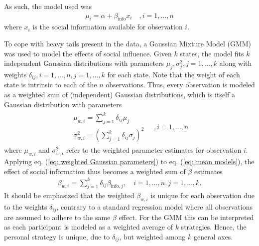 \documentclass[9pt,twocolumn,twoside,lineno]{pnas-new}
\begin{document}
{%
As such, the model used was
\begin{align}
	\mu_i = \alpha+\beta_\text{info} x_i \quad, i=1,\dots,n  \label{eq: mean models}
\end{align}
where $x_i$ is the social information available %
for observation $i$.

To cope with heavy tails present in the data, a Gaussian Mixture Model (GMM) was used to model the effects of social influence. Given $k$ states, the model fits $k$ independent Gaussian distributions with parameters $\mu_j, \sigma^2_j, j=1,\dots,k$ along with weights $\delta_{ij}, i=1,\dots, n, j=1,\dots ,k$ for each state. Note that the weight of each state is intrinsic to each of the $n$ observations. Thus, every observation is modeled as a weighted sum of (independent) Gaussian distributions, which is itself a Gaussian distribution with parameters
\begin{align}
\begin{array}{l}
	\mu_{w,i} = \sum_{j=1}^k \delta_{ij} \mu_j \\
	\sigma^2_{w,i} = \left(\sum_{j=1}^k \delta_{ij} \sigma_j\right)^2
\end{array}
\quad, i=1,\dots,n \label{eq: weighted Gaussian parameters}
\end{align}
where $\mu_{w,i}$ and $\sigma^2_{w,i}$ refer to the weighted parameter estimates for observation $i$. Applying eq. (\ref{eq: weighted Gaussian parameters}) to eq. (\ref{eq: mean models}), the effect of social information thus becomes a weighted sum of $\beta$ estimates
\begin{align}
	\beta_{w,i} = \sum_{j=1}^k \delta_{ij} \beta_{\text{info},j}, \quad i=1,\dots, n, j=1,\dots, k. \label{eq: weighted beta}
\end{align}
It should be emphasized that the weighted $\beta_{w,i}$ is unique for each observation due to the weights $\delta_{ij}$, contrary to a standard regression model where all observations are assumed to adhere to the same $\beta$ effect. For the GMM this can be interpreted as each participant is modeled as a weighted average of $k$ strategies. Hence, the personal strategy is unique, due to $\delta_{ij}$, but weighted among $k$ general axes. 
}
\end{document}
